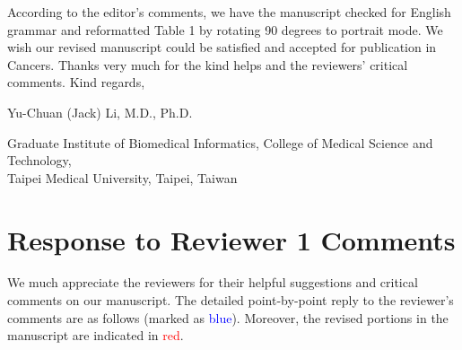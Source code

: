 \documentclass[preprint,12pt]{elsarticle}
\begin{document}
According to the editor's comments, we have the manuscript checked for English grammar and reformatted Table 1 by rotating 90 degrees to portrait mode. %
We wish our revised manuscript could be satisfied and accepted for publication in Cancers. Thanks very much for the kind helps and the reviewers' critical comments.
Kind regards,

Yu-Chuan (Jack) Li, M.D., Ph.D.

Graduate Institute of Biomedical Informatics, 
College of Medical Science and Technology,\\
Taipei Medical University,
Taipei, Taiwan


\pagebreak

\section*{Response to Reviewer 1 Comments}
We much appreciate the reviewers for their helpful suggestions and critical comments on our manuscript. The detailed point-by-point reply to the reviewer's comments are as follows (marked as \textcolor{blue}{blue}). 
Moreover, the revised portions in the manuscript are indicated in \textcolor{red}{red}.

\end{document}
